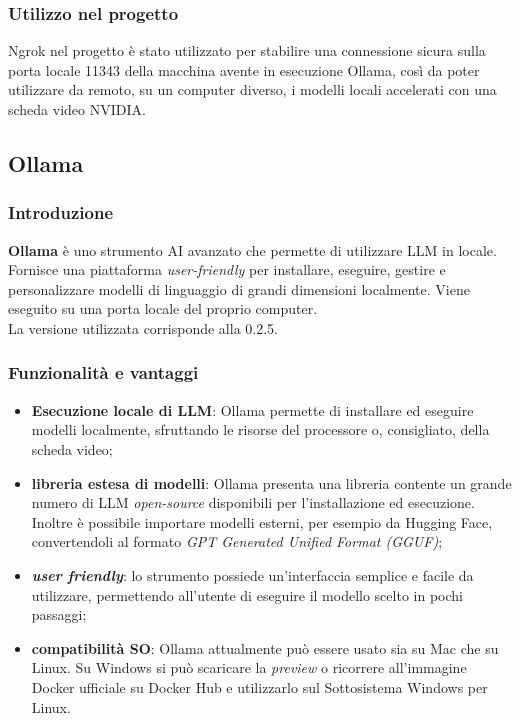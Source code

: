 \subsubsection{Utilizzo nel progetto}
 Ngrok nel progetto è stato utilizzato per stabilire una connessione sicura sulla porta locale 11343 della macchina avente in esecuzione Ollama, così da poter utilizzare da remoto, su un computer diverso, i modelli locali accelerati con una scheda video NVIDIA.

\subsection{Ollama}

\subsubsection{Introduzione}
\textbf{Ollama} è uno strumento AI avanzato che permette di utilizzare LLM in locale. Fornisce una piattaforma \textit{user-friendly} per installare, eseguire, gestire e personalizzare modelli di linguaggio di grandi dimensioni localmente. Viene eseguito su una porta locale del proprio computer.\\
La versione utilizzata corrisponde alla 0.2.5.

\subsubsection{Funzionalità e vantaggi}
\begin{itemize}
    \item \textbf{Esecuzione locale di LLM}: Ollama permette di installare ed eseguire modelli localmente, sfruttando le risorse del processore o, consigliato, della scheda video;
    \item \textbf{libreria estesa di modelli}: Ollama presenta una libreria contente un grande numero di LLM \textit{open-source} disponibili per l’installazione ed esecuzione. Inoltre è possibile importare modelli esterni, per esempio da Hugging Face, convertendoli al formato \textit{GPT Generated Unified Format (GGUF)};
    \item \textbf{\textit{user friendly}}: lo strumento possiede un’interfaccia semplice e facile da utilizzare, permettendo all’utente di eseguire il modello scelto in pochi passaggi;
    \item \textbf{compatibilità SO}: Ollama attualmente può essere usato sia su Mac che su Linux. Su Windows si può scaricare la \textit{preview} o ricorrere all'immagine Docker ufficiale su Docker Hub e utilizzarlo sul Sottosistema Windows per Linux.
\end{itemize}

